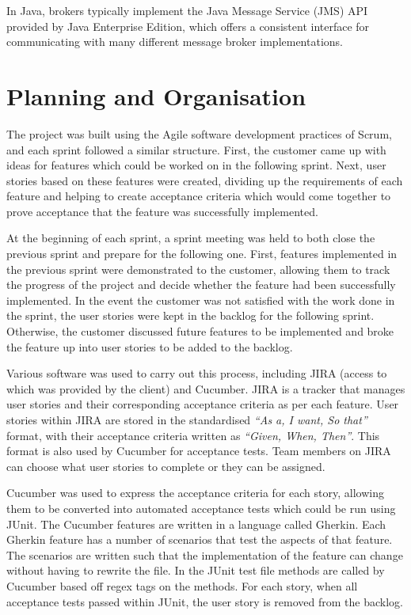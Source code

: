 \documentclass[a4paper, 12pt]{article}
\begin{document}
In Java, brokers typically implement the Java Message Service (JMS) API provided by Java Enterprise Edition, which offers a consistent interface for communicating with many different message broker implementations.

\newpage

\section{Planning and Organisation}
\label{sec:planning}

The project was built using the Agile software development practices of Scrum, and each sprint followed a similar structure. First, the customer came up with ideas for features which could be worked on in the following sprint. Next, user stories based on these features were created, dividing up the requirements of each feature and helping to create acceptance criteria which would come together to prove acceptance that the feature was successfully implemented.

At the beginning of each sprint, a sprint meeting was held to both close the previous sprint and prepare for the following one. First, features implemented in the previous sprint were demonstrated to the customer, allowing them to track the progress of the project and decide whether the feature had been successfully implemented. In the event the customer was not satisfied with the work done in the sprint, the user stories were kept in the backlog for the following sprint. Otherwise, the customer discussed future features to be implemented and broke the feature up into user stories to be added to the backlog.

Various software was used to carry out this process, including JIRA (access to which was provided by the client) and Cucumber. JIRA is a tracker that manages user stories and their corresponding acceptance criteria as per each feature. User stories within JIRA are stored in the standardised \emph{``As a, I want, So that''} format, with their acceptance criteria written as \emph{``Given, When, Then''}. This format is also used by Cucumber for acceptance tests. Team members on JIRA can choose what user stories to complete or they can be assigned.

Cucumber was used to express the acceptance criteria for each story, allowing them to be converted into automated acceptance tests which could be run using JUnit. The Cucumber features are written in a language called Gherkin. Each Gherkin feature has a number of scenarios that test the aspects of that feature. The scenarios are written such that the implementation of the feature can change without having to rewrite the file. In the JUnit test file methods are called by Cucumber based off regex tags on the methods. For each story, when all acceptance tests passed within JUnit, the user story is removed from the backlog.
\end{document}
